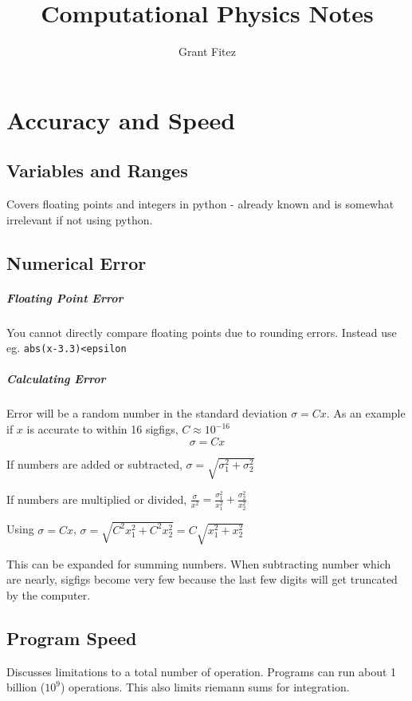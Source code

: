 \documentclass{report}
\begin{document}
\title{Computational Physics Notes}
\author{Grant Fitez}
\maketitle

\setcounter{chapter}{3}
\chapter{Accuracy and Speed}

\section {Variables and Ranges}

Covers floating points and integers in python - already known and is somewhat irrelevant if not using python.
\section {Numerical Error}
\paragraph{Floating Point Error}
You cannot directly compare floating points due to rounding errors. Instead use eg. \verb|abs(x-3.3)<epsilon|
\paragraph{Calculating Error}
Error will be a random number in the standard deviation $\sigma=Cx$. As an example if $x$ is accurate to within 16 sigfigs, $C\approx10^{-16}$
\[\sigma=Cx\]

If numbers are added or subtracted, $\sigma = \sqrt{\sigma_{1}^{2}+\sigma_{2}^{2}}$

If numbers are multiplied or divided, $\frac{\sigma}{x^{2}}=\frac{\sigma_{1}^{2}}{x_{1}^{2}}+\frac{\sigma_{2}^{2}}{x_{2}^{2}}$

Using $\sigma=Cx$, $\sigma=\sqrt{C^2x_1^2+C^2x_2^2}=C\sqrt{x_1^2+x_2^2}$

This can be expanded for summing numbers.
\newline\newline
When subtracting number which are nearly, sigfigs become very few because the last few digits will get truncated by the computer.
\section {Program Speed}
Discusses limitations to a total number of operation. Programs can run about 1 billion ($10^9$) operations. This also limits riemann sums for integration.
\end{document}

